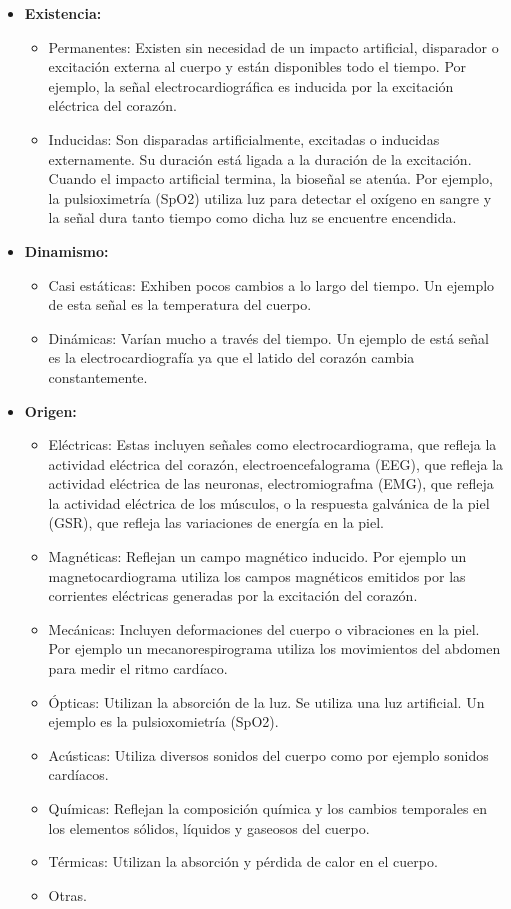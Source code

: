 \begin{itemize}
	\item \textbf{Existencia:}
		\begin{itemize}
			\item Permanentes: Existen sin necesidad de un impacto artificial, disparador o excitación externa al cuerpo y están disponibles todo el tiempo. Por ejemplo, la señal electrocardiográfica es inducida por la excitación eléctrica del corazón.
			\item Inducidas: Son disparadas artificialmente, excitadas o inducidas externamente. Su duración está ligada a la duración de la excitación. Cuando el impacto artificial termina, la bioseñal se atenúa. Por ejemplo, la pulsioximetría (SpO2) utiliza luz para detectar el oxígeno en sangre y la señal dura tanto tiempo como dicha luz se encuentre encendida.
		\end{itemize}
	\item \textbf{Dinamismo:}
		\begin{itemize}
			\item Casi estáticas:  Exhiben pocos cambios a lo largo del tiempo. Un ejemplo de esta señal es la temperatura del cuerpo.
			\item Dinámicas: Varían mucho a través del tiempo. Un ejemplo de está señal es la electrocardiografía ya que el latido del corazón cambia constantemente.
		\end{itemize}
	\item \textbf{Origen:}
		\begin{itemize}
			\item Eléctricas: Estas incluyen señales como electrocardiograma, que refleja la actividad eléctrica del corazón, electroencefalograma (EEG), que refleja la actividad eléctrica de las neuronas,  electromiografma (EMG), que refleja la actividad eléctrica de los músculos, o la respuesta galvánica de la piel (GSR), que refleja las variaciones de energía en la piel.
			\item Magnéticas: Reflejan un campo magnético inducido. Por ejemplo un magnetocardiograma utiliza los campos magnéticos emitidos por las corrientes eléctricas generadas por la excitación del corazón.
			\item Mecánicas: Incluyen deformaciones del cuerpo o vibraciones en la piel. Por ejemplo un mecanorespirograma utiliza los movimientos del abdomen para medir el ritmo cardíaco.
			\item Ópticas: Utilizan la absorción de la luz. Se utiliza una luz artificial. Un ejemplo es la pulsioxomietría (SpO2).
			\item Acústicas: Utiliza diversos sonidos del cuerpo como por ejemplo sonidos cardíacos.
			\item Químicas: Reflejan la composición química y los cambios temporales en los elementos sólidos, líquidos y gaseosos del cuerpo.
			\item Térmicas: Utilizan la absorción y pérdida de calor en el cuerpo.
			\item Otras.
	\end{itemize}
\end{itemize}

